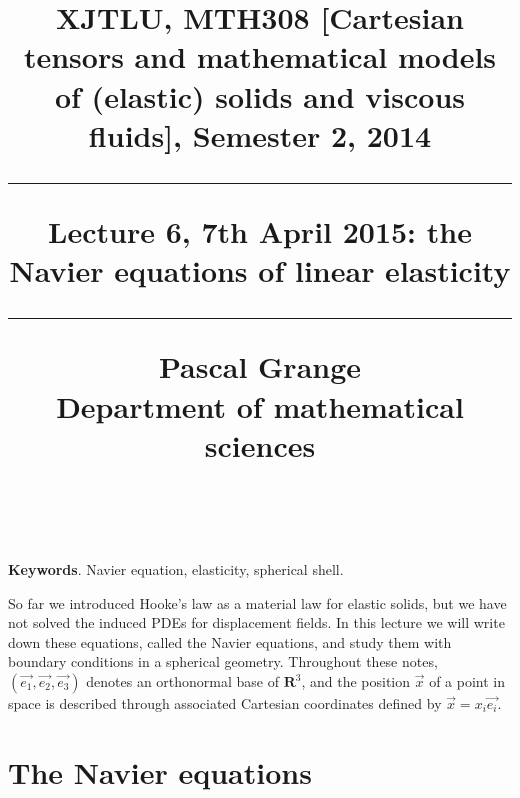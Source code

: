\documentclass[DIV=12]{article}
\newcommand{\eBase}{(\vec{e_1}, \vec{e_2},\vec{e_3})}
\begin{document}
\title{
\noindent\hrulefill
\begin{flushleft}
{\Large \bf{XJTLU, MTH308 [Cartesian tensors and mathematical models of (elastic) solids and viscous fluids], Semester 2, 2014\\
\vspace{8mm}
\hrule
\vspace{6mm}
 Lecture 6, 7th April 2015: the Navier equations of linear elasticity}}
\vspace{8mm}
\hrule
\vspace{6mm}
{\Large{Pascal Grange\\
Department of mathematical sciences\\
{}\\
}}
\noindent\hrulefill
\end{flushleft}}
\date{}
\author{}
\maketitle
\vspace{-9mm}
 
{\bf{Keywords}}. Navier equation, elasticity, spherical shell.\\
\vspace{3mm}

\tableofcontents 

\vspace{8mm}

So far we introduced Hooke's  law as a material law for elastic solids,
 but we have not solved the induced PDEs for displacement fields.
 In this lecture we will write down these equations, called the Navier equations,
 and study them with boundary conditions in a spherical geometry.
 Throughout these notes, $\eBase$ denotes an orthonormal 
 base of ${\mathbf{R}}^3$, and the position $\vec{x}$ 
 of a point in space is described through associated Cartesian
 coordinates defined by $\vec{x} = x_i \vec{e_i}$.

\section{The Navier equations}
\end{document}
